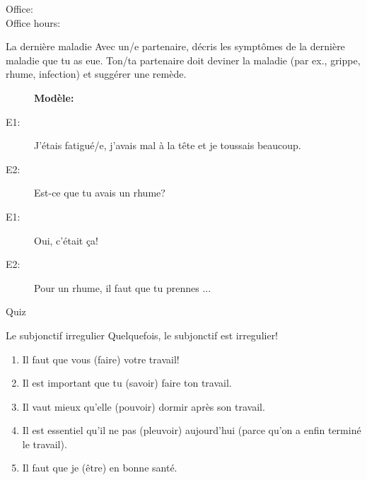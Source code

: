 \documentclass{beamer}
\subtitle[Maladies, remèdes et subjonctif]{Les maladies, les remèdes et plus de subjonctif}
\begin{document}
  \begin{frame}
    \titlepage
    \tiny{Office: \\
          Office hours: }
  \end{frame}

  \begin{frame}{La dernière maladie}
    Avec un/e partenaire, décris les symptômes de la dernière maladie que tu as eue.
    Ton/ta partenaire doit deviner la maladie (par ex., grippe, rhume, infection) et suggérer une remède.
    \begin{description}
      \item[] \textbf{Modèle:}
      \item[E1:] J'étais fatigué/e, j'avais mal à la tête et je toussais beaucoup.
      \item[E2:] Est-ce que tu avais un rhume?
      \item[E1:] Oui, c'était ça!
      \item[E2:] Pour un rhume, il faut que tu prennes ...
    \end{description}
  \end{frame}

  \begin{frame}{}
    \begin{center}
      \Large Quiz
    \end{center}
  \end{frame}

  \begin{frame}{Le subjonctif irregulier}
    Quelquefois, le subjonctif est irregulier!
    \begin{enumerate}
      \item Il faut \alert{que} vous \underline{} (faire) votre travail!
      \item Il est important \alert{que} tu \underline{} (savoir) faire ton travail.
      \item Il vaut mieux \alert{qu'}elle \underline{} (pouvoir) dormir après son travail.
      \item Il est essentiel \alert{qu'}il ne \underline{} pas (pleuvoir) aujourd'hui (parce qu'on a enfin terminé le travail).
      \item Il faut \alert{que} je \underline{} (être) en bonne santé.
    \end{enumerate}
  \end{frame}
\end{document}
